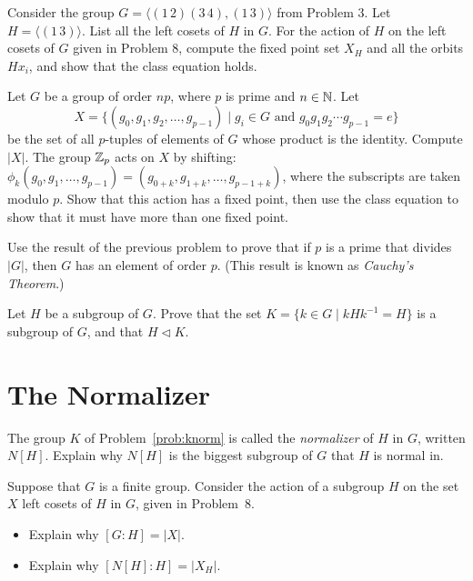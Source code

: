 \begin{problem}
Consider the group $G=\langle (1\,2)(3\,4), (1\,3) \rangle$ from Problem 3. Let $H = \langle (1\,3) \rangle$. List all the left cosets of $H$ in $G$. For the action of $H$ on the left cosets of $G$ given in Problem 8, compute the fixed point set $X_H$ and all the orbits $Hx_i$, and show that the class equation holds.
\end{problem}



\begin{problem}
Let $G$ be a group of order $np$, where $p$ is prime and $n\in\mathbb{N}$. Let
$$X = \{(g_0,g_1,g_2,\ldots,g_{p-1}) \mid g_i\in G \text{ and } g_0g_1g_2\cdots g_{p-1} = e\}$$
be the set of all $p$-tuples of elements of $G$ whose product is the identity. Compute $|X|$. The group $\mathbb{Z}_p$ acts on $X$ by shifting: $\phi_k(g_0,g_1,\ldots,g_{p-1}) = (g_{0+k}, g_{1+k}, \ldots, g_{p-1+k})$, where the subscripts are taken modulo $p$. Show that this action has a fixed point, then use the class equation to show that it must have more than one fixed point.
\end{problem}



\begin{problem}
Use the result of the previous problem to prove that if $p$ is a prime that divides $\lvert G \rvert$, then $G$ has an element of order $p$. (This result is known as \emph{Cauchy's Theorem}.)
\end{problem}




\begin{problem}\label{prob:knorm}
Let $H$ be a subgroup of $G$.  Prove that the set $K = \{ k \in G \mid kHk^{-1} = H\}$ is a subgroup of $G$, and that $H \lhd K$.
\end{problem}



\section{The Normalizer}

\begin{problem}
The group $K$ of Problem~\ref{prob:knorm} is called the \emph{normalizer} of $H$ in $G$, written $N[H]$.  Explain why $N[H]$ is the biggest subgroup of $G$ that $H$ is normal in.
\end{problem}



\begin{problem}
Suppose that $G$ is a finite group. Consider the action of a subgroup $H$ on the set $X$ left cosets of $H$ in $G$, given in Problem~8.
\begin{itemize}
 \item Explain why $[G:H] = \lvert X \rvert$.
 \item Explain why $[N[H]:H] = \lvert X_H \rvert$.
\end{itemize}
\end{problem}



